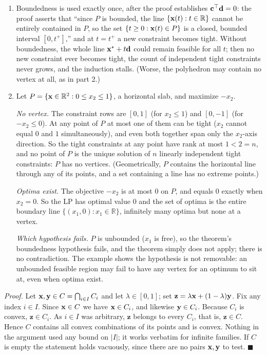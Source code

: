 \begin{enumerate}
\item Boundedness is used exactly once, after the proof establishes $\mathbf{c}^\top \mathbf{d} = 0$: the proof asserts that ``since $P$ is bounded, the line $\{\mathbf{x}(t) : t \in \mathbb{R}\}$ cannot be entirely contained in $P$, so the set $\{t \geq 0 : \mathbf{x}(t) \in P\}$ is a closed, bounded interval $[0, t^+]$,'' and at $t = t^+$ a new constraint becomes tight. Without boundedness, the whole line $\mathbf{x}^* + t\mathbf{d}$ could remain feasible for all $t$; then no new constraint ever becomes tight, the count of independent tight constraints never grows, and the induction stalls. (Worse, the polyhedron may contain no vertex at all, as in part 2.)
\item Let $P = \{\mathbf{x} \in \mathbb{R}^2 : 0 \leq x_2 \leq 1\}$, a horizontal slab, and maximize $-x_2$.

\emph{No vertex.} The constraint rows are $[0, 1]$ (for $x_2 \leq 1$) and $[0, -1]$ (for $-x_2 \leq 0$). At any point of $P$ at most one of them can be tight ($x_2$ cannot equal $0$ and $1$ simultaneously), and even both together span only the $x_2$-axis direction. So the tight constraints at any point have rank at most $1 < 2 = n$, and no point of $P$ is the unique solution of $n$ linearly independent tight constraints: $P$ has no vertices. (Geometrically, $P$ contains the horizontal line through any of its points, and a set containing a line has no extreme points.)

\emph{Optima exist.} The objective $-x_2$ is at most $0$ on $P$, and equals $0$ exactly when $x_2 = 0$. So the LP has optimal value $0$ and the set of optima is the entire boundary line $\{(x_1, 0) : x_1 \in \mathbb{R}\}$, infinitely many optima but none at a vertex.

\emph{Which hypothesis fails.} $P$ is unbounded ($x_1$ is free), so the theorem's boundedness hypothesis fails, and the theorem simply does not apply; there is no contradiction. The example shows the hypothesis is not removable: an unbounded feasible region may fail to have any vertex for an optimum to sit at, even when optima exist.
\end{enumerate}

\emph{Proof.} Let $\mathbf{x}, \mathbf{y} \in C = \bigcap_{i \in I} C_i$ and let $\lambda \in [0, 1]$; set $\mathbf{z} = \lambda\mathbf{x} + (1 - \lambda)\mathbf{y}$. Fix any index $i \in I$. Since $\mathbf{x} \in C$ we have $\mathbf{x} \in C_i$, and likewise $\mathbf{y} \in C_i$. Because $C_i$ is convex, $\mathbf{z} \in C_i$. As $i \in I$ was arbitrary, $\mathbf{z}$ belongs to every $C_i$, that is, $\mathbf{z} \in C$. Hence $C$ contains all convex combinations of its points and is convex. Nothing in the argument used any bound on $|I|$; it works verbatim for infinite families. If $C$ is empty the statement holds vacuously, since there are no pairs $\mathbf{x}, \mathbf{y}$ to test. $\blacksquare$

